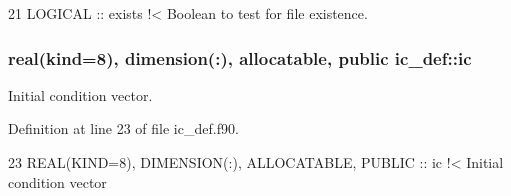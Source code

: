 \begin{DoxyCode}
21   \textcolor{keywordtype}{LOGICAL} :: exists\textcolor{comment}{ !< Boolean to test for file existence.}
\end{DoxyCode}
\subsubsection[{\texorpdfstring{ic}{ic}}]{\setlength{\rightskip}{0pt plus 5cm}real(kind=8), dimension(\+:), allocatable, public ic\+\_\+def\+::ic}\hypertarget{namespaceic__def_abef3b68b2ee81311ed2c796cba3a382f}{}\label{namespaceic__def_abef3b68b2ee81311ed2c796cba3a382f}


Initial condition vector. 



Definition at line 23 of file ic\+\_\+def.\+f90.


\begin{DoxyCode}
23   \textcolor{keywordtype}{REAL(KIND=8)}, \textcolor{keywordtype}{DIMENSION(:)}, \textcolor{keywordtype}{ALLOCATABLE}, \textcolor{keywordtype}{PUBLIC} :: ic\textcolor{comment}{ !< Initial condition vector}
\end{DoxyCode}

